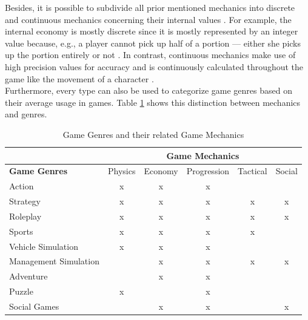 \documentclass[MGS,Master,english]{twbook}%
\begin{document}
Besides, it is possible to subdivide all prior mentioned mechanics into discrete and continuous mechanics concerning their internal values \cite{gameDesign::gameMechanicsAdvancedGameDesign}. For example, the internal economy is mostly discrete since it is mostly represented by an integer value because, e.g., a player cannot pick up half of a portion — either she picks up the portion entirely or not \cite{gameDesign::gameMechanicsAdvancedGameDesign}. In contrast, continuous mechanics make use of high precision values for accuracy and is continuously calculated throughout the game like the movement of a character \cite{gameDesign::gameMechanicsAdvancedGameDesign}. \\
Furthermore, every type can also be used to categorize game genres based on their average usage in games. Table \ref{GameMechanicsToGenre} shows this distinction between mechanics and genres.
\begin{table}[!ht]
	\centering
	{%
		\begin{tabular}{l||c|c|c|c|c|}
			\cline{2-6}
			& \multicolumn{5}{c|}{\textbf{Game Mechanics}}        \\ \hline 
			\multicolumn{1}{|l||}{\textbf{Game Genres}}  & Physics & Economy & Progression & Tactical & Social \\ \hline \hline
			\multicolumn{1}{|l||}{Action}                & x       & x       & x           &          &        \\ \hline
			\multicolumn{1}{|l||}{Strategy}              & x       & x       & x           & x        & x      \\ \hline
			\multicolumn{1}{|l||}{Roleplay}              & x       & x       & x           & x        & x      \\ \hline
			\multicolumn{1}{|l||}{Sports}                & x       & x       & x           & x        &        \\ \hline
			\multicolumn{1}{|l||}{Vehicle Simulation}    & x       & x       & x           &          &        \\ \hline
			\multicolumn{1}{|l||}{Management Simulation} &         & x       & x           & x        & x      \\ \hline
			\multicolumn{1}{|l||}{Adventure}             &         & x       & x           &          &        \\ \hline
			\multicolumn{1}{|l||}{Puzzle}                & x       &         & x           &          &        \\ \hline
			\multicolumn{1}{|l||}{Social Games}          &         & x       & x           &          & x      \\ \hline
		\end{tabular}%
	}
	\caption{Game Genres and their related Game Mechanics \protect\cite{gameDesign::gameMechanicsAdvancedGameDesign}}
	\label{GameMechanicsToGenre}
\end{table}\\
\end{document}
